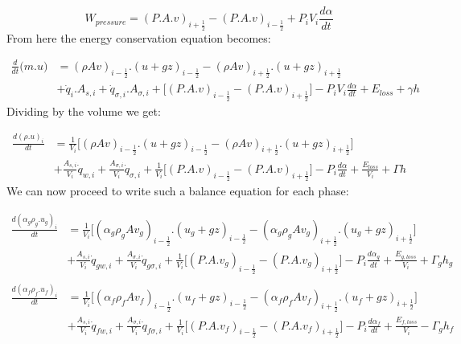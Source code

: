 \documentclass[11pt,letterpaper,titlepage]{article}
\newcommand{\half}{\frac{1}{2}}
\begin{document}
\begin{equation*}
W_{pressure}=(P.A.v)_{i+\half} - (P.A.v)_{i-\half} + P_i V_i \frac{d\alpha}{dt}
\end{equation*}
\newline
\noindent
From here the energy conservation equation becomes:

\begin{equation*}
\begin{aligned}
\frac{d}{dt} \biggr( m.u \biggr)&=(\rho Av)_{i-\half}.(u+gz)_{i-\half} - (\rho Av)_{i+\half}.(u+gz)_{i+\half} \\
&+\dot{q}_i.A_{s,i} +\dot{q}_{\sigma ,i}.A_{\sigma,i} + \biggr[   (P.A.v)_{i-\half} - (P.A.v)_{i+\half}   \biggr] - P_i V_i \frac{d\alpha}{dt} + E_{loss} + \gamma h
\end{aligned}
\end{equation*}
\newline
\noindent
Dividing by the volume we get:

\begin{equation*}
\begin{aligned}
\frac{d(\rho.u)_i}{dt} &=\frac{1}{V_i}\biggr[ (\rho Av)_{i-\half}.(u+gz)_{i-\half} - (\rho Av)_{i+\half}.(u+gz)_{i+\half} \biggr] \\
&+\frac{A_{s,i}}{V_i}\dot{q}_{w,i}+\frac{A_{\sigma ,i}}{V_i}\dot{q}_{\sigma,i} + \frac{1}{V_i}\biggr[   (P.A.v)_{i-\half} - (P.A.v)_{i+\half}   \biggr] - P_i \frac{d\alpha}{dt} + \frac{E_{loss}}{V_i} + \Gamma h
\end{aligned}
\end{equation*}
\newline
We can now proceed to write such a balance equation for each phase:

\begin{equation}
\begin{aligned}
\frac{d(\alpha_g\rho_g.u_g)_i}{dt} &=\frac{1}{V_i}\biggr[ (\alpha_g\rho_g Av_g)_{i-\half}.(u_g+gz)_{i-\half} - (\alpha_g\rho_g Av_g)_{i+\half}.(u_g+gz)_{i+\half} \biggr] \\
&+\frac{A_{s,i}}{V_i}\dot{q}_{gw,i}+\frac{A_{\sigma ,i}}{V_i}\dot{q}_{g\sigma, i} + \frac{1}{V_i}\biggr[   (P.A.v_g)_{i-\half} - (P.A.v_g)_{i+\half}   \biggr] - P_i \frac{d\alpha_g}{dt} + \frac{E_{g,loss}}{V_i}
+\Gamma_g h_g\\
\end{aligned}
\end{equation}
\vspace{0.5cm}
\begin{equation}
\begin{aligned}
\frac{d(\alpha_f\rho_f.u_f)_i}{dt} &=\frac{1}{V_i}\biggr[ (\alpha_f\rho_f Av_f)_{i-\half}.(u_f+gz)_{i-\half} - (\alpha_f\rho_f Av_f)_{i+\half}.(u_f+gz)_{i+\half} \biggr] \\
&+\frac{A_{s,i}}{V_i}\dot{q}_{fw,i}+\frac{A_{\sigma ,i}}{V_i}\dot{q}_{f\sigma, i} + \frac{1}{V_i}\biggr[   (P.A.v_f)_{i-\half} - (P.A.v_f)_{i+\half}   \biggr] - P_i \frac{d\alpha_f}{dt} + \frac{E_{f,loss}}{V_i}
-\Gamma_g h_f
\end{aligned}
\end{equation}
\end{document}
